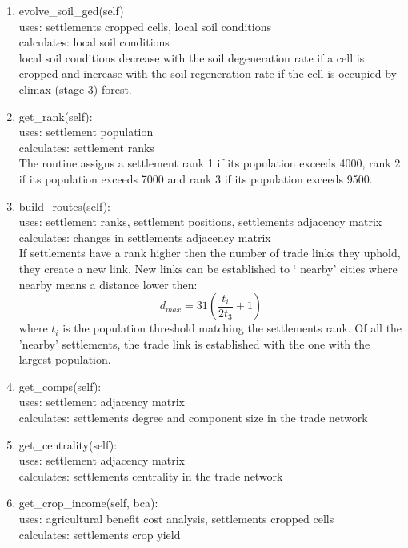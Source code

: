 \begin{enumerate}
	\item evolve_soil_ged(self)\\
		uses: settlements cropped cells, local soil conditions\\
		calculates: local soil conditions \\
		local soil conditions decrease with the soil degeneration rate if a cell is cropped and increase with the soil regeneration rate if the cell is occupied by climax (stage 3) forest.
	\item get_rank(self):\\
		uses: settlement population\\
		calculates: settlement ranks\\
		The routine assigns a settlement rank 1 if its population exceeds 4000, rank 2 if its population exceeds 7000 and rank 3 if its population exceeds 9500.
	\item build_routes(self):\\
		uses: settlement ranks, settlement positions, settlements adjacency matrix\\
		calculates: changes in settlements adjacency matrix\\
		If settlements have a rank higher then the number of trade links they uphold, they create a new link. New links can be established to ` nearby' cities where nearby means a distance lower then:
		\begin{equation}
			d_{max} = 31 \left( \frac{t_i}{2 t_3} +1 \right)
			\label{closenessk_threshold}
		\end{equation}
		where $t_i$ is the population threshold matching the settlements rank. Of all the 'nearby' settlements, the trade link is established with the one with the largest population.
	\item get_comps(self):\\
		uses: settlement adjacency matrix\\
		calculates: settlements degree and component size in the trade network\\
	\item get_centrality(self):\\
		uses: settlement adjacency matrix\\
		calculates: settlements centrality in the trade network\\
	\item get_crop_income(self, bca):\\
		uses: agricultural benefit cost analysis, settlements cropped cells\\
		calculates: settlements crop yield\\

\end{enumerate}
